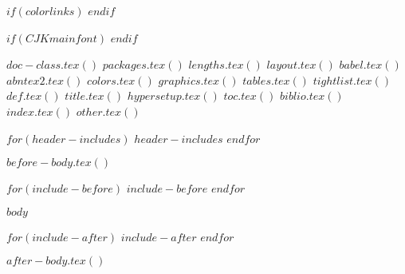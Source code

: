 





$if(colorlinks)$
$endif$

$if(CJKmainfont)$
$endif$

$doc-class.tex()$
$packages.tex()$
$lengths.tex()$
$layout.tex()$
$babel.tex()$
$abntex2.tex()$
$colors.tex()$
$graphics.tex()$
$tables.tex()$
$tightlist.tex()$
$def.tex()$
$title.tex()$
$hypersetup.tex()$
$toc.tex()$
$biblio.tex()$
$index.tex()$
$other.tex()$

$for(header-includes)$
$header-includes$
$endfor$





\pretextual

$before-body.tex()$

$for(include-before)$
$include-before$
$endfor$


\textual
$body$

$for(include-after)$
$include-after$
$endfor$

$after-body.tex()$

